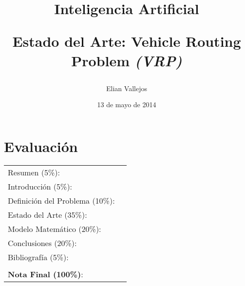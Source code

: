 \documentclass[letter, 10pt]{article}
\begin{document}
\title{Inteligencia Artificial \\ \begin{Large}Estado del Arte: Vehicle Routing Problem \emph{(VRP)}\end{Large}}
\author{Elian Vallejos}
\date{13 de mayo de 2014}
\maketitle


\section*{Evaluaci\'on}

\begin{tabular}{ll}
Resumen (5\%): & \underline{\hspace{2cm}} \\
Introducci\'on (5\%):  & \underline{\hspace{2cm}} \\
Definici\'on del Problema (10\%):  & \underline{\hspace{2cm}} \\
Estado del Arte (35\%):  & \underline{\hspace{2cm}} \\
Modelo Matem\'atico (20\%): &  \underline{\hspace{2cm}}\\
Conclusiones (20\%): &  \underline{\hspace{2cm}}\\
Bibliograf\'ia (5\%): & \underline{\hspace{2cm}}\\
 &  \\
\textbf{Nota Final (100\%)}:   & \underline{\hspace{2cm}}
\end{tabular}
\vspace{2cm}
\end{document}
